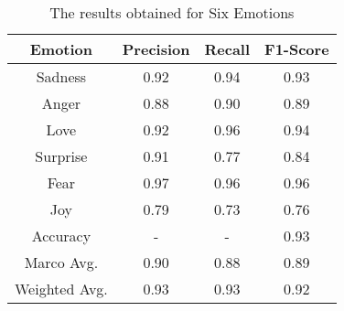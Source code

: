 \begin{table}[h!]
\centering
\begin{tabular}{|c|c|c|c|}
\hline
Emotion       & Precision & Recall & F1-Score \\ \hline
Sadness       & 0.92      & 0.94   & 0.93     \\ \hline
Anger         & 0.88      & 0.90   & 0.89     \\ \hline
Love          & 0.92      & 0.96   & 0.94     \\ \hline
Surprise      & 0.91      & 0.77   & 0.84     \\ \hline
Fear          & 0.97      & 0.96   & 0.96     \\ \hline
Joy           & 0.79      & 0.73   & 0.76     \\ \hline
Accuracy      & -         & -      & 0.93     \\ \hline
Marco Avg.    & 0.90      & 0.88   & 0.89     \\ \hline
Weighted Avg. & 0.93      & 0.93   & 0.92     \\ \hline
\end{tabular}
\caption{The results obtained for Six Emotions}
\end{table}